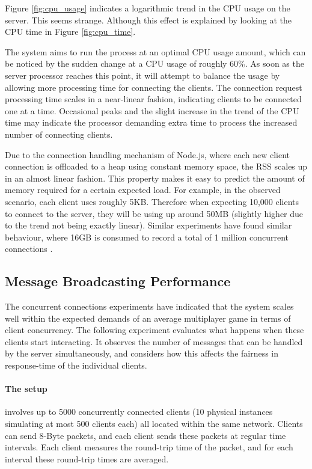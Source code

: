 \documentclass[bsc, 12pt, twoside, singlespacing, parskip, abbrevs, notimes, normalheadings, logo]{styles/infthesis}
\begin{document}
Figure \ref{fig:cpu_usage} indicates a logarithmic trend in the CPU usage on the server. This seems strange. Although this effect is explained by looking at the CPU time in Figure \ref{fig:cpu_time}. 

The system aims to run the process at an optimal CPU usage amount, which can be noticed by the sudden change at a CPU usage of roughly 60\%. As soon as the server processor reaches this point, it will attempt to balance the usage by allowing more processing time for connecting the clients. The connection request processing time scales in a near-linear fashion, indicating clients to be connected one at a time. Occasional peaks and the slight increase in the trend of the CPU time may indicate the processor demanding extra time to process the increased number of connecting clients.

Due to the connection handling mechanism of Node.js, where each new client connection is offloaded to a heap using constant memory space, the RSS scales up in an almost linear fashion. This property makes it easy to predict the amount of memory required for a certain expected load. For example, in the observed scenario, each client uses roughly 5KB. Therefore when expecting 10,000 clients to connect to the server, they will be using up around 50MB (slightly higher due to the trend not being exactly linear). Similar experiments have found similar behaviour, where 16GB is consumed to record a total of 1 million concurrent connections \cite{modejs_1m_connections}.


\subsection{Message Broadcasting Performance}
The concurrent connections experiments have indicated that the system scales well within the expected demands of an average multiplayer game in terms of client concurrency. The following experiment evaluates what happens when these clients start interacting. It observes the number of messages that can be handled by the server simultaneously, and considers how this affects the fairness in response-time of the individual clients.

\paragraph*{The setup}involves up to 5000 concurrently connected clients (10 physical instances simulating at most 500 clients each) all located within the same network. Clients can send 8-Byte packets, and each client sends these packets at regular time intervals. Each client measures the round-trip time of the packet, and for each interval these round-trip times are averaged.
\end{document}

